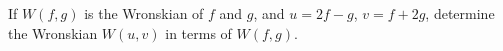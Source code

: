 \documentclass[12pt]{exam}
\begin{document}
    




\newpage

\begin{questions}

    \question If $W(f,g)$ is the Wronskian of $f$ and $g$, and $u=2f-g$, $v= f+2g$, determine the Wronskian $W(u,v)$ in terms of $W(f,g)$. 
    
    
\end{questions}
\end{document}
